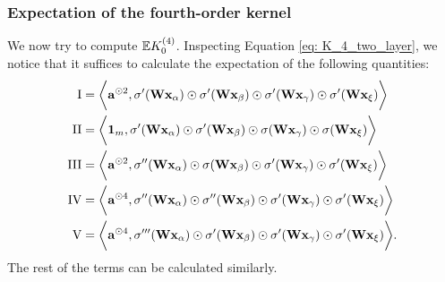 \subsubsection{Expectation of the fourth-order kernel}
We now try to compute ${\mathbb{E}} {K}^{(4)}_0$. Inspecting Equation \eqref{eq: K_4_two_layer}, we notice that it suffices to calculate the expectation of the following quantities: 
\begin{align*}
	\RN{1}  &= \bigg\la\rva^{\odot 2},\sigma'(\rmW \rvx_\alpha) \odot \sigma'(\rmW \rvx_\beta) \odot \sigma'(\rmW \rvx_\gamma) \odot \sigma'(\rmW \rvx_\xi)   \bigg\ra \\
	\RN{2}  &= \bigg\la \mathbf{1}_m, \sigma'(\rmW \rvx_\alpha) \odot \sigma'(\rmW \rvx_\beta) \odot \sigma(\rmW \rvx_\gamma) \odot \sigma(\rmW \rvx_\xi)  \bigg\ra \\
	\RN{3}  &=  \bigg\la\rva^{\odot 2}, \sigma''(\rmW \rvx_\alpha) \odot \sigma(\rmW \rvx_\beta) \odot \sigma'(\rmW \rvx_\gamma) \odot \sigma'(\rmW \rvx_\xi)\bigg\ra \\
	\RN{4}  &= \bigg\la\rva^{\odot 4}, \sigma''(\rmW \rvx_\alpha) \odot \sigma''(\rmW \rvx_\beta) \odot \sigma'(\rmW \rvx_\gamma) \odot \sigma'(\rmW \rvx_\xi)\bigg\ra \\
	\RN{5}  &= \bigg\la\rva^{\odot 4}, \sigma'''(\rmW\rvx_\alpha) \odot \sigma'(\rmW \rvx_\beta) \odot \sigma'(\rmW \rvx_\gamma) \odot \sigma'(\rmW \rvx_\xi) \bigg\ra.
\end{align*}
The rest of the terms can be calculated similarly.
~\\

